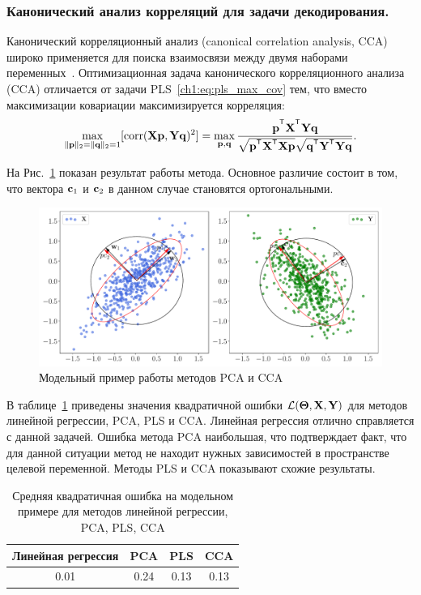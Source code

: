 \subsubsection{Канонический анализ корреляций для задачи декодирования.}
Канонический корреляционный анализ (canonical correlation analysis, CCA) широко применяется для поиска взаимосвязи между двумя наборами переменных~\cite{hotelling1992relations,anderson1962introduction}. 
Оптимизационная задача канонического корреляционного анализа (CCA) отличается от задачи PLS~\eqref{ch1:eq:pls_max_cov} тем, что вместо максимизации ковариации максимизируется корреляция:
\begin{equation}
	\max_{\|\bp\|_{2}=\|\bq\|_{2}=1}[ \text{corr}(\bX \bp, \bY \bq)^{2}] = \max_{\bp, \bq} \frac{\bp^{\T} \bX^{\T} \bY \bq}{\sqrt{\bp^{\T} \bX^{\T}  \bX \bp} \sqrt{\bq^{\T} \bY^{\T}  \bY\bq}}.
	\label{ch1:eq:cca_max_corr}
\end{equation}

На Рис.~\ref{ch1:fig:cca_toy_example} показан результат работы метода. 
Основное различие состоит в том, что вектора $\mathbf{c}_1$ и $\mathbf{c}_2$ в данном случае становятся ортогональными.

\begin{figure}[h]
	\centering
	\includegraphics[width=\linewidth]{figs/ch1/cca_toy_example}
	\caption{Модельный пример работы методов PCA и CCA}
	\label{ch1:fig:cca_toy_example}
\end{figure}

В таблице~\ref{ch1:tbl:toy_example_results} приведены значения квадратичной ошибки $\mathcal{L}(\boldsymbol{\Theta}, \mathbf{X}, \mathbf{Y})$ для методов линейной регрессии, PCA, PLS и CCA.
Линейная регрессия отлично справляется с данной задачей.
Ошибка метода PCA наибольшая, что подтверждает факт, что для данной ситуации метод не находит нужных зависимостей в пространстве целевой переменной. 
Методы PLS и CCA показывают схожие результаты.

\begin{table}[]
	\centering
	\begin{tabular}{|c|c|c|c|}
		\hline
		\textbf{Линейная регрессия} & \textbf{PCA}   & \textbf{PLS}  &  \textbf{CCA}  \\ \hline
		0.01 &  0.24   &  0.13 &  0.13 \\ \hline
	\end{tabular}
	\caption{Средняя квадратичная ошибка на модельном примере для методов линейной регрессии, PCA, PLS, CCA}
	\label{ch1:tbl:toy_example_results}
\end{table} 

